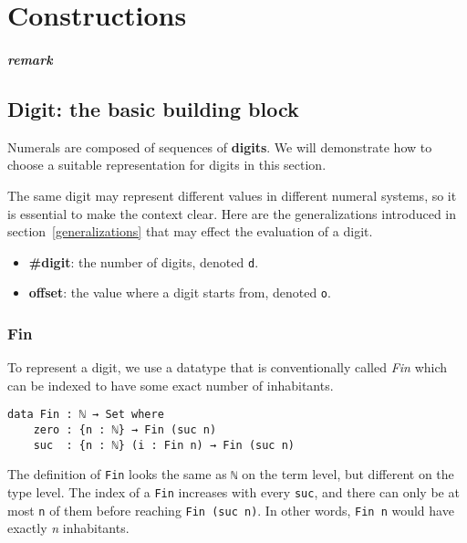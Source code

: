 \documentclass[../thesis.tex]{subfiles}
\begin{document}
\chapter{Constructions}

\paragraph{remark}


\section{Digit: the basic building block}\label{digit}

Numerals are composed of sequences of \textbf{digits}. We will demonstrate how
to choose a suitable representation for digits in this section.

The same digit may represent different values in different numeral systems, so it
is essential to make the context clear. Here are the generalizations introduced in
section~\ref{generalizations} that may effect the evaluation of a digit.

\begin{itemize}
    \item \textbf{\#digit}: the number of digits, denoted {\lstinline|d|}.
    \item \textbf{offset}: the value where a digit starts from, denoted {\lstinline|o|}.
\end{itemize}

\subsection{Fin}

To represent a digit, we use a datatype that is conventionally called \textit{Fin}
which can be indexed to have some exact number of inhabitants.

\begin{lstlisting}
data Fin : ℕ → Set where
    zero : {n : ℕ} → Fin (suc n)
    suc  : {n : ℕ} (i : Fin n) → Fin (suc n)
\end{lstlisting}

The definition of {\lstinline|Fin|} looks the same as {\lstinline|ℕ|} on the term
level, but different on the type level. The index of a {\lstinline|Fin|} increases
with every {\lstinline|suc|}, and there can only be at most {\lstinline|n|} of
them before reaching {\lstinline|Fin (suc n)|}. In other words, {\lstinline|Fin n|}
would have exactly \textit{n} inhabitants.
\end{document}
